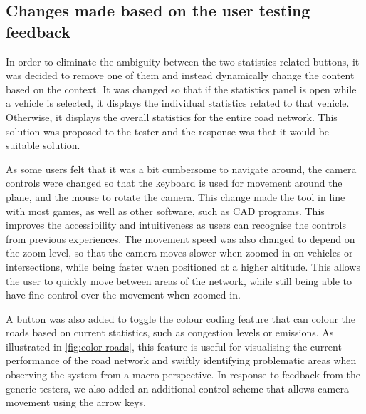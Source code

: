     \subsection{Changes made based on the user testing feedback}
        In order to eliminate the ambiguity between the two statistics related buttons, it was decided to remove one of them and instead dynamically change the content based on the context. It was changed so that if the statistics panel is open while a vehicle is selected, it displays the individual statistics related to that vehicle. Otherwise, it displays the overall statistics for the entire road network. This solution was proposed to the tester and the response was that it would be suitable solution.

        As some users felt that it was a bit cumbersome to navigate around, the camera controls were changed so that the keyboard is used for movement around the plane, and the mouse to rotate the camera. This change made the tool in line with most games, as well as other software, such as CAD programs. This improves the accessibility and intuitiveness as users can recognise the controls from previous experiences. The movement speed was also changed to depend on the zoom level, so that the camera moves slower when zoomed in on vehicles or intersections, while being faster when positioned at a higher altitude. This allows the user to quickly move between areas of the network, while still being able to have fine control over the movement when zoomed in.

        A button was also added to toggle the colour coding feature that can colour the roads based on current statistics, such as congestion levels or emissions. As illustrated in \ref{fig:color-roads}, this feature is useful for visualising the current performance of the road network and swiftly identifying problematic areas when observing the system from a macro perspective. In response to feedback from the generic testers, we also added an additional control scheme that allows camera movement using the arrow keys.

